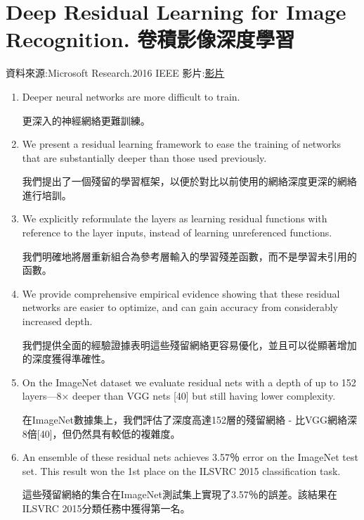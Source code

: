 
\section{Deep Residual Learning for Image Recognition. 卷積影像深度學習}
資料來源:{Microsoft Research.2016 IEEE\cite{DBLP:journals/corr/HeZRS15}}
影片:\href{Research Talk (in Hindi) Deep Residual Learning for Image Recognition.mp4}{影片}
      
\begin{enumerate}
\item Deeper neural networks are more difficult to train. 

更深入的神經網絡更難訓練。

\item We present a residual learning framework to ease the training of networks that are substantially deeper than those used previously. 

我們提出了一個殘留的學習框架，以便於對比以前使用的網絡深度更深的網絡進行培訓。

\item We explicitly reformulate the layers as learning residual functions with reference to the layer inputs, instead of learning unreferenced functions. 

我們明確地將層重新組合為參考層輸入的學習殘差函數，而不是學習未引用的函數。

\item We provide comprehensive empirical evidence showing that these residual networks are easier to optimize, and can gain accuracy from considerably increased depth. 

我們提供全面的經驗證據表明這些殘留網絡更容易優化，並且可以從顯著增加的深度獲得準確性。

\item On the ImageNet dataset we evaluate residual nets with a depth of up to 152 layers—8× deeper than VGG nets [40] but still having lower complexity. 

在ImageNet數據集上，我們評估了深度高達152層的殘留網絡 - 比VGG網絡深8倍[40]，但仍然具有較低的複雜度。

\item An ensemble of these residual nets achieves 3.57％ error on the ImageNet test set. This result won the 1st place on the ILSVRC 2015 classification task. 

這些殘留網絡的集合在ImageNet測試集上實現了3.57％的誤差。該結果在ILSVRC 2015分類任務中獲得第一名。


\end{enumerate}
